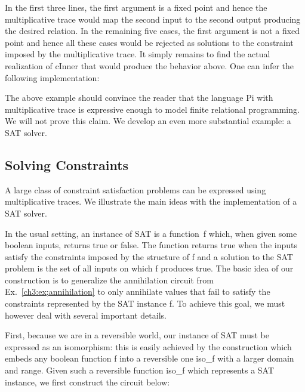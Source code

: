 \documentclass{llncs}
\begin{document}
In the first three lines, the first argument is a fixed point and hence the
multiplicative trace would map the second input to the second output
producing the desired relation. In the remaining five cases, the first
argument is not a fixed point and hence all these cases would be rejected as
solutions to the constraint imposed by the multiplicative trace. It simply
remains to find the actual realization of {{cInner}} that would produce the
behavior above. One can infer the following implementation:

%     

The above example should convince the reader that the language {{Pi}}
with multiplicative trace is expressive enough to model finite relational
programming. We will not prove this claim. We develop an even more
substantial example: a SAT solver.

\subsection{Solving Constraints}
\label{ch3:sec:constraints}

A large class of constraint satisfaction problems can be expressed
using multiplicative traces. We illustrate the main ideas with the
implementation of a SAT solver.

In the usual setting, an instance of SAT is a function~{{f}} which,
when given some boolean inputs, returns {{true}} or {{false}}. The
function returns {{true}} when the inputs satisfy the constraints
imposed by the structure of {{f}} and a solution to the SAT problem is
the set of all inputs on which {{f}} produces {{true}}. The basic idea
of our construction is to generalize the annihilation circuit from
Ex.~\ref{ch3:ex;annihilation} to only annihilate values that fail to
satisfy the constraints represented by the SAT instance {{f}}. To
achieve this goal, we must however deal with several important
details.

First, because we are in a reversible world, our instance of SAT must be
expressed as an isomorphism: this is easily achieved by the construction
which embeds any boolean function {{f}} into a reversible one {{iso_f}} with
a larger domain and range.  Given such a reversible function {{iso_f}} which
represents a SAT instance, we first construct the circuit below:
\end{document}
